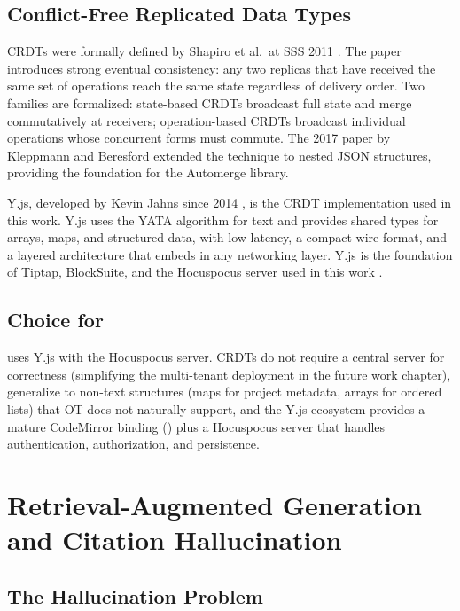 \subsection{Conflict-Free Replicated Data Types}

CRDTs were formally defined by Shapiro et al.\ at SSS 2011 \cite{shapiro2011crdt, shapiro2011comprehensive}. The paper introduces strong eventual consistency: any two replicas that have received the same set of operations reach the same state regardless of delivery order. Two families are formalized: state-based CRDTs broadcast full state and merge commutatively at receivers; operation-based CRDTs broadcast individual operations whose concurrent forms must commute. The 2017 paper by Kleppmann and Beresford \cite{kleppmann2017jsoncrdt} extended the technique to nested JSON structures, providing the foundation for the Automerge library.

Y.js, developed by Kevin Jahns since 2014 \cite{yjs2024}, is the CRDT implementation used in this work. Y.js uses the YATA algorithm for text and provides shared types for arrays, maps, and structured data, with low latency, a compact wire format, and a layered architecture that embeds in any networking layer. Y.js is the foundation of Tiptap, BlockSuite, and the Hocuspocus server used in this work \cite{hocuspocus2024}.

\subsection{Choice for \sh{}}

\sh{} uses Y.js with the Hocuspocus server. CRDTs do not require a central server for correctness (simplifying the multi-tenant deployment in the future work chapter), generalize to non-text structures (maps for project metadata, arrays for ordered lists) that OT does not naturally support, and the Y.js ecosystem provides a mature CodeMirror binding () plus a Hocuspocus server that handles authentication, authorization, and persistence.

\section{Retrieval-Augmented Generation and Citation Hallucination}
\label{sec:lit-rag}

\subsection{The Hallucination Problem}

